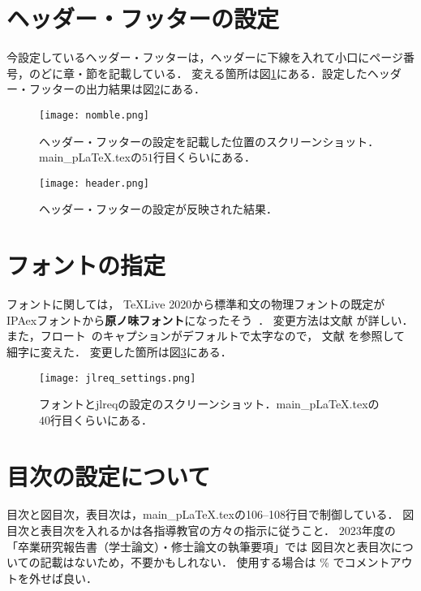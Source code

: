 \section{ヘッダー・フッターの設定}
今設定しているヘッダー・フッターは，ヘッダーに下線を入れて小口にページ番号，のどに章・節を記載している．
変える箇所は図\ref{fig:nomble}にある．設定したヘッダー・フッターの出力結果は図\ref{fig:header}にある．

\begin{figure}[h]
  \centering
  \texttt{[image: nomble.png]}
  \caption{ヘッダー・フッターの設定を記載した位置のスクリーンショット．main\_pLaTeX.texの$51$行目くらいにある．}
  \label{fig:nomble}
\end{figure}
\begin{figure}[h]
  \centering
  \texttt{[image: header.png]}
  \caption{ヘッダー・フッターの設定が反映された結果．}
  \label{fig:header}
\end{figure}


\section{フォントの指定}
フォントに関しては，
\TeX Live 2020から標準和文の物理フォントの既定が
IPAexフォントから\textbf{\textsf{原ノ味フォント}}になったそう~\cite{font}．
変更方法は文献 \cite{font} が詳しい．
また，フロート~\cite{float}のキャプションがデフォルトで太字なので，
文献 \cite{jlreq} を参照して細字に変えた．
変更した箇所は図\ref{fig:jlreqset}にある．

\begin{figure}[h]
  \centering
  \texttt{[image: jlreq\_settings.png]}
  \caption{フォントとjlreqの設定のスクリーンショット．main\_pLaTeX.texの$40$行目くらいにある．}
  \label{fig:jlreqset}
\end{figure}


\section{目次の設定について}
目次と図目次，表目次は，main\_pLaTeX.texの106--108行目で制御している．
図目次と表目次を入れるかは各指導教官の方々の指示に従うこと．
$2023$年度の「卒業研究報告書（学士論文）・修士論文の執筆要項」では
図目次と表目次についての記載はないため，不要かもしれない．
使用する場合は \% でコメントアウトを外せば良い．


